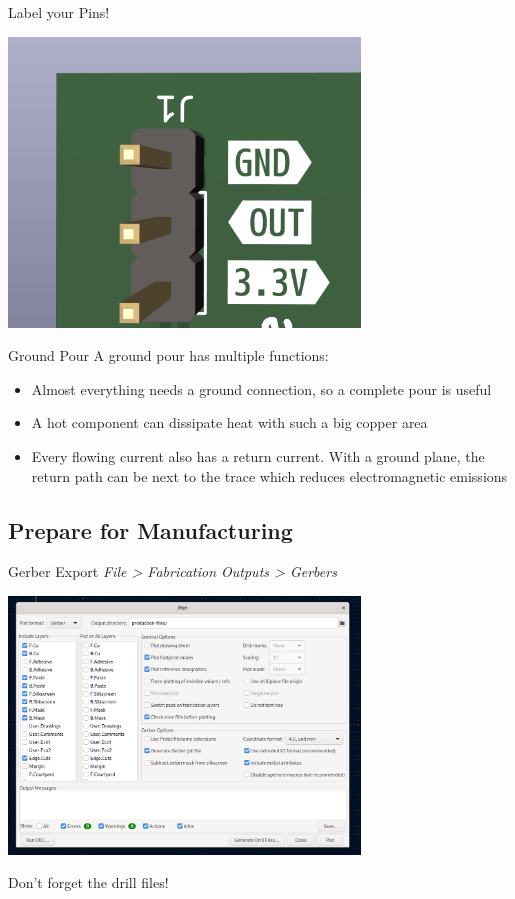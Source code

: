 \documentclass{beamer}
\begin{document}
\begin{frame}{Label your Pins!}
  \begin{center}
    \includegraphics[width=0.7\textwidth]{images/pin-label.png}
  \end{center}
\end{frame}

\begin{frame}{Ground Pour}
  A ground pour has multiple functions:
  \begin{itemize}
    \item Almost everything needs a ground connection, so a complete pour is useful
    \item A hot component can dissipate heat with such a big copper area
    \item Every flowing current also has a return current. With a ground plane, the return path can be next to the trace which reduces electromagnetic emissions
  \end{itemize}
\end{frame}

\subsection{Prepare for Manufacturing}

\begin{frame}{Gerber Export}
  \textit{File > Fabrication Outputs > Gerbers}
  \begin{center}
    \includegraphics[width=0.7\textwidth]{images/gerber-export.png}
  \end{center}
  Don't forget the drill files!
\end{frame}
\end{document}
